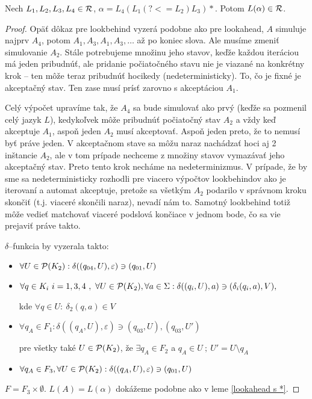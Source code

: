 \begin{lema}\label{lookbehind s *}
Nech $L_1,L_2,L_3,L_4 \in \R$, $\alpha = L_4 \left( L_1 \left( ?<=L_2\right) L_3 \right) *$. Potom $L(\alpha) \in \R$.
\end{lema} 
\begin{proof}
Opäť dôkaz pre lookbehind vyzerá podobne ako pre lookahead, $A$ simuluje naj\-prv $A_4$, potom $A_1,A_3,A_1,A_3, \dots$ až po koniec slova. Ale musíme zmeniť simulovanie $A_2$. Stále potrebujeme množinu jeho stavov, keďže každou iteráciou má jeden pribudnúť, ale pridanie počiatočného stavu nie je viazané na konkrétny krok -- ten môže teraz pribudnúť hocikedy (nedeterministicky). To, čo je fixné je akceptačný stav. Ten zase musí prísť zarovno s akceptáciou $A_1$. 

Celý výpočet upravíme tak, že $A_4$ sa bude simulovať ako prvý (keďže sa pozmenil celý jazyk $L$), kedykoľvek môže pribudnúť počiatočný stav $A_2$ a vždy keď akceptuje $A_1$, aspoň jeden $A_2$ musí akceptovať. Aspoň jeden preto, že to nemusí byť práve jeden. V akceptačnom stave sa môžu naraz nachádzať hoci aj 2 inštancie $A_2$, ale v tom prípade nechceme z množiny stavov vymazávať jeho akceptačný stav. Preto tento krok necháme na nedeterminizmus. V prípade, že by sme sa nedeterministicky rozhodli pre viacero výpočtov lookbehindov ako je iterovaní a automat akceptuje, pretože sa všetkým $A_2$ podarilo v správnom kroku skončiť (t.j. viaceré skončili naraz), nevadí nám to. Samotný lookbehind totiž môže vedieť matchovať viaceré podslová končiace v jednom bode, čo sa vie prejaviť práve takto. 

$\delta$--funkcia by vyzerala takto:

\begin{itemize}
  \item $\forall U \in \P(K_2) : \delta ((q_{04},U),\varepsilon ) \ni (q_{01},U)$
  \item $\forall q \in K_i~i=1,3,4 ~, ~\forall U \in \P(K_2),\forall a \in \Sigma : \delta ((q_i,U),a) \ni (\delta _i (q_i,a),V),$
  
  kde $\forall q \in U:~\delta_2(q,a) \in V$
  \item $\forall q_A \in F_1 : \delta ((q_A,U),\varepsilon ) \ni (q_{03},U), (q_{03},U')$
  
  pre všetky také $U \in \P(K_2)$, že $ \exists q_A \in F_2$ a $ q_A \in U ~ ; ~ U'=U \setminus q_A$
  \item $\forall q_A \in F_3, \forall U \in \P(K_2) : \delta ((q_A,U),\varepsilon ) \ni (q_{01},U)$
\end{itemize}
$F = F_3 \times \emptyset$. $L(A) = L(\alpha)$ dokážeme podobne ako v leme \ref{lookahead s *}.
\end{proof}

